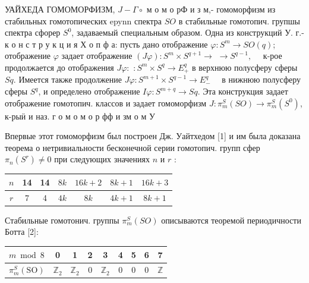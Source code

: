 \documentclass[10pt]{article}
\begin{document}
УАЙХЕДА ГОМОМОРФИЗМ, $J-\Gamma \circ$ м о м о рФ и з м,- гомоморфизм из стабильных гомотопических epynn спектра $S O$ в стабильные гомотопич. групшы спектра сфорер $S^{0}$, задаваемый специальным образом. Одна из конструкций У. г.- к о н с т р у к ц и я Х о п ф а: пусть дано отображение $\varphi: S^{m} \rightarrow S O(q)$; отображение $\varphi$ задает отображение $(J \varphi): S^{m} \times S^{q+1} \rightarrow$ $\rightarrow S^{q-1}, \quad$ к-рое продолжается до отображения $J \varphi:$ $: S^{m} \times S^{q} \rightarrow E_{+}^{q}$ в верхнюю полусферу сферы $S q$. Имеется также продолжение $J \varphi: S^{m+1} \times S^{q-1} \rightarrow E_{-}^{q} \quad$ в нижнюю полусферу сферы $S^{q}$, и определено отображение $I \varphi: S^{m+q} \rightarrow S q$. Эта конструкция задает отображение гомотопич. классов и задает гомоморфизм $J: \pi_{m}^{S}(S O) \rightarrow \pi_{m}^{S}\left(S^{0}\right)$, к-рыӥ и наз. г о м о м о р фф и зм о м У



Впервые этот гомоморфизм был построен Дж. Уайтхедом [1] и им была доказана теорема о нетривиальности бесконечной серии гомотопич. групп сфер $\pi_{n}\left(S^{r}\right) \neq 0$ при следующих значениях $n$ и $r$ :



\begin{center}

\begin{tabular}{c|c|c|c|c|c|c}

\hline

$n$ & 14 & 14 & $8 k$ & $16 k+2$ & $8 k+1$ & $16 k+3$ \\

\hline

$r$ & 7 & 4 & $4 k$ & $8 k$ & $4 k+1$ & $8 k+1$ \\

\hline

\end{tabular}

\end{center}



Стабильные гомотонич. группы $\pi_{m}^{S}(S O)$ описываются теоремой периодичности Ботта [2]:



\begin{center}

\begin{tabular}{l|c|c|c|c|c|c|c|c}

\hline

$m \bmod 8$ & 0 & 1 & 2 & 3 & 4 & 5 & 6 & 7 \\

\hline

$\pi_{m}^{S}(\mathrm{SO})$ & $\mathbb{Z}_{2}$ & $\mathbb{Z}_{2}$ & 0 & $\mathbb{Z}_{2}$ & 0 & 0 & 0 & $\mathbb{Z}$ \\

\hline

\end{tabular}

\end{center}
\end{document}

